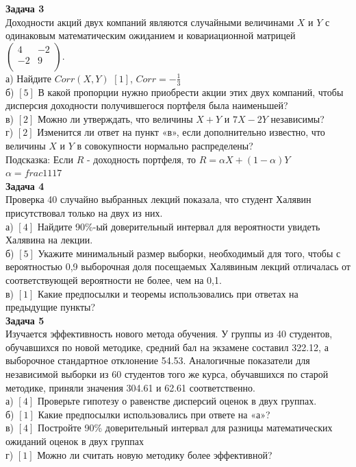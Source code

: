 \documentclass[12pt, a4paper]{article}\usepackage[]{graphicx}\usepackage[]{color}
\begin{document}
\textbf{Задача 3} \\ %
Доходности акций двух компаний являются случайными величинами $X$
и $Y$ с одинаковым математическим ожиданием и ковариационной
матрицей  $\left(%
\begin{array}{cc}
  4 & -2 \\
  -2 & 9 \\
\end{array}%
\right).$ \\
а) Найдите $Corr(X,Y)$  $[1]$, $Corr=-\frac{1}{3}$\\
б) $[5]$ В какой пропорции нужно приобрести акции этих двух
компаний,
чтобы дисперсия доходности получившегося портфеля была наименьшей? \\
в)  $[2]$ Можно ли утверждать, что величины $X+Y$ и $7X-2Y$ независимы? \\
г) $[2]$ Изменится ли ответ на пункт «в», если дополнительно
известно,
что величины $X$ и $Y$ в совокупности нормально распределены? \\
Подсказка: Если $R$ - доходность портфеля, то $R=\alpha
X+(1-\alpha)Y$ \\
$\alpha=frac{11}{17}$ \\

\textbf{Задача 4} \\ %
Проверка 40 случайно выбранных лекций показала, что студент
Халявин присутствовал только на двух из них. \\
а) $[4]$ Найдите 90\%-ый доверительный интервал для вероятности
увидеть Халявина на лекции. \\
б) $[5]$ Укажите минимальный размер выборки, необходимый для того,
чтобы с вероятностью 0,9 выборочная доля посещаемых Халявиным
лекций
отличалась от соответствующей вероятности не более, чем на 0,1. \\
в) $[1]$ Какие предпосылки и теоремы использовались при ответах на предыдущие пункты? \\


\textbf{Задача 5} \\ %
Изучается эффективность нового метода обучения. У группы из 40
студентов, обучавшихся по новой методике, средний бал на экзамене
составил 322.12, а выборочное стандартное отклонение 54.53.
Аналогичные показатели для независимой выборки из 60 студентов
того же курса, обучавшихся по старой методике,
приняли значения 304.61 и 62.61 соответственно. \\
а) $[4]$ Проверьте гипотезу о равенстве дисперсий оценок в двух
группах.
\\
б) $[1]$ Какие предпосылки использовались при ответе на «а»? \\
в) $[4]$ Постройте 90\% доверительный интервал для разницы
математических ожиданий оценок в двух группах \\
г) $[1]$ Можно ли считать новую методику более эффективной? \\
\end{document}
